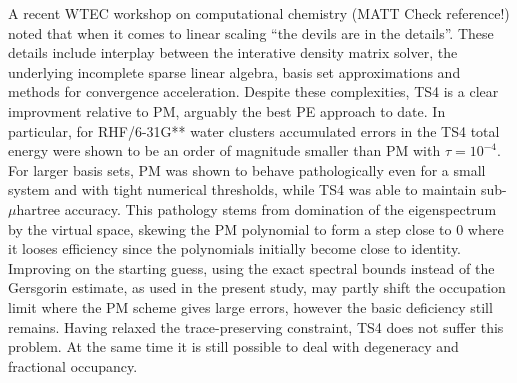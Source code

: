 \commentoutA{\documentclass[prb,aps,twocolumn,twocolumngrid,secnumarabic,superbib,hyperref]{revtex4}}
\begin{document}
{A recent WTEC workshop on computational chemistry \cite{WTEC00} (MATT Check reference!) noted that when it comes
to linear scaling ``the devils are in the details''. These details include
interplay between the interative density matrix solver, the underlying incomplete sparse 
linear algebra, basis set approximations and methods for convergence acceleration.   
Despite these complexities, TS4 is a clear improvment relative to PM, arguably the best 
PE approach to date.  
In particular,  for RHF/6-31G** water clusters accumulated errors in the TS4 total energy 
were shown to be an order of magnitude smaller than PM with $\tau=10^{-4}$.  
For larger basis sets, PM was shown to behave pathologically even 
for a small system and with tight numerical thresholds, while TS4 was able to maintain
sub-$\mu$hartree accuracy.  This pathology stems from domination of the eigenspectrum
by the virtual space, skewing the PM polynomial to form a step close to $0$
where it looses efficiency since the polynomials initially become close
to identity. Improving on the starting guess, using the
exact spectral bounds instead of the Gersgorin estimate, as used in the present study, 
may partly shift the occupation limit where the PM scheme gives large errors, however the
basic deficiency still remains. Having relaxed the trace-preserving constraint, TS4
does not suffer this problem.
At the same time it is still possible to deal with degeneracy and fractional occupancy.

}
\end{document}
